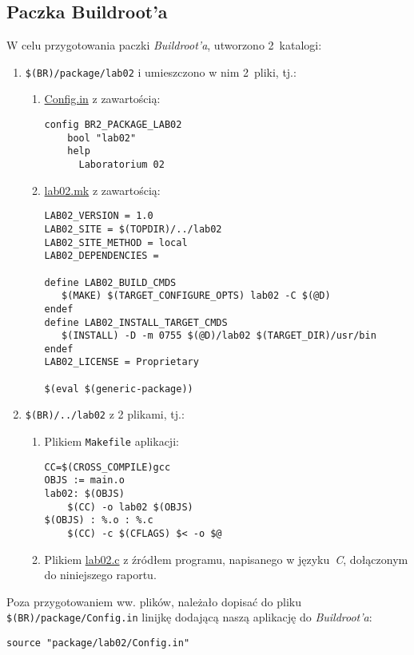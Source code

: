 \documentclass{article}
\begin{document}

\subsection{Paczka Buildroot'a}
\label{brpackage}

W celu przygotowania paczki \emph{Buildroot'a}, utworzono 2~katalogi:
\begin{enumerate}
\item \texttt{\$(BR)/package/lab02} i umieszczono w nim 2~pliki, tj.:
\begin{enumerate}
\item \url{Config.in} z zawartością:
\begin{Verbatim}[frame=single]
config BR2_PACKAGE_LAB02
	bool "lab02"
	help
	  Laboratorium 02
\end{Verbatim}
\item \url{lab02.mk} z zawartością:
\begin{Verbatim}[frame=single]
LAB02_VERSION = 1.0
LAB02_SITE = $(TOPDIR)/../lab02
LAB02_SITE_METHOD = local
LAB02_DEPENDENCIES = 

define LAB02_BUILD_CMDS
   $(MAKE) $(TARGET_CONFIGURE_OPTS) lab02 -C $(@D)
endef
define LAB02_INSTALL_TARGET_CMDS
   $(INSTALL) -D -m 0755 $(@D)/lab02 $(TARGET_DIR)/usr/bin
endef
LAB02_LICENSE = Proprietary

$(eval $(generic-package))
\end{Verbatim}
\end{enumerate}
\item \texttt{\$(BR)/../lab02} z 2 plikami, tj.:
\begin{enumerate}
\item Plikiem \texttt{Makefile} aplikacji:
\begin{Verbatim}[frame=single]
CC=$(CROSS_COMPILE)gcc
OBJS := main.o
lab02: $(OBJS)
	$(CC) -o lab02 $(OBJS)
$(OBJS) : %.o : %.c
	$(CC) -c $(CFLAGS) $< -o $@
\end{Verbatim}
\item Plikiem \url{lab02.c} z źródłem programu, napisanego w języku~\emph{C}, dołączonym do niniejszego raportu.
\end{enumerate}
\end{enumerate}

Poza przygotowaniem ww. plików, należało dopisać do pliku \texttt{\$(BR)/package/Config.in} linijkę dodającą naszą aplikację do \emph{Buildroot'a}:
\begin{Verbatim}[frame=single]
source "package/lab02/Config.in"
\end{Verbatim}
\end{document}
